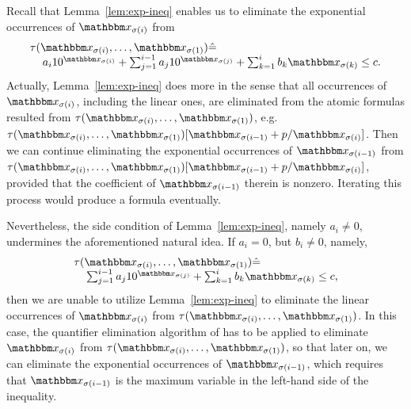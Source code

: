 Recall that Lemma~\ref{lem:exp-ineq} enables us to eliminate the exponential occurrences of $\ivarx_{\sigma(i)}$ from 
$$
\begin{array}{l}
\tau(\ivarx_{\sigma(i)}, \ldots, \ivarx_{\sigma(1)}) \Def  \\
\hspace{4mm} 
a_i 10^{\ivarx_{\sigma(i)}}+\sum_{j=1}^{i-1} a_j 10^{\ivarx_{\sigma(j)}} + \sum_{k=1}^{i}b_k \ivarx_{\sigma(k)} \le c.
\end{array}
$$
Actually, Lemma~\ref{lem:exp-ineq} does more in the sense that all occurrences of $\ivarx_{\sigma(i)}$, including the linear ones, are eliminated from the atomic formulas resulted from $\tau(\ivarx_{\sigma(i)}, \ldots, \ivarx_{\sigma(1)})$, e.g. $\tau(\ivarx_{\sigma(i)}, \ldots, \ivarx_{\sigma(1)})[\ivarx_{\sigma(i-1)} + p /\ivarx_{\sigma(i)}]$. Then we can continue eliminating the exponential occurrences of $\ivarx_{\sigma(i-1)}$ from $\tau(\ivarx_{\sigma(i)}, \ldots, \ivarx_{\sigma(1)})[\ivarx_{\sigma(i-1)} + p /\ivarx_{\sigma(i)}]$, provided that the coefficient of $\ivarx_{\sigma(i-1)}$ therein is nonzero. Iterating this process would produce a {\pa} formula eventually.

Nevertheless, the side condition of Lemma~\ref{lem:exp-ineq}, namely $a_i \neq 0$, undermines the aforementioned natural idea. If $a_i = 0$, but $b_i \neq 0$, namely, 
$$
\begin{array}{l}
\tau(\ivarx_{\sigma(i)}, \ldots, \ivarx_{\sigma(1)}) \Def  \\
\hspace{4mm} 
\sum_{j=1}^{i-1} a_j 10^{\ivarx_{\sigma(j)}} + \sum_{k=1}^{i}b_k \ivarx_{\sigma(k)} \le c,
\end{array}
$$
then we are unable to utilize Lemma~\ref{lem:exp-ineq} to eliminate the linear occurrences of $\ivarx_{\sigma(i)}$ from $\tau(\ivarx_{\sigma(i)}, \ldots, \ivarx_{\sigma(1)})$. In this case, the quantifier elimination algorithm of {\pa} has to be applied to eliminate $\ivarx_{\sigma(i)}$ from $\tau(\ivarx_{\sigma(i)}, \ldots, \ivarx_{\sigma(1)})$, so that later on, we can eliminate the exponential occurrences of $\ivarx_{\sigma(i-1)}$, which requires that $\ivarx_{\sigma(i-1)}$ is the maximum variable in the left-hand side of the inequality.

